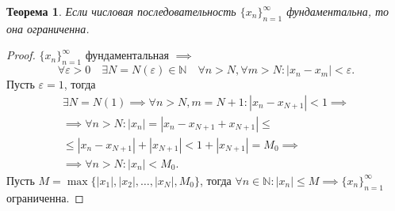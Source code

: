 \documentclass[a4paper,12pt]{article} %
\newtheorem{theorem}{Теорема}[subsection]
\theoremstyle{remark}
\begin{document}
\begin{theorem}
	Если числовая последовательность $\{x_n\}_{n=1}^{\infty}$ фундаментальна, то она ограниченна.
\end{theorem}
\begin{proof}
	$\{x_n\}_{n=1}^{\infty}$ фундаментальная $\implies$
	\[
	\forall \varepsilon>0 \quad \exists N=N(\varepsilon)\in \mathbb{N} \quad \forall n>N, \forall m>N : |x_n-x_m| < \varepsilon
	.\] 
	Пусть $\varepsilon=1$, тогда
	\begin{multline}
	\exists N=N(1) \implies \forall n>N, m=N+1 : |x_n - x_{N+1}|<1 \implies \\
	\implies \forall n>N : |x_n| = |x_n - x_{N+1} + x_{N+1}| \le \\
	\le |x_n - x_{N+1}| + |x_{N+1}| < 1 + |x_{N+1}| = M_0 \implies \\
	\implies \forall n>N : |x_n| < M_0.
	\end{multline}
	Пусть $M = \max \{|x_1|, |x_2|, \ldots, |x_N|, M_0\}$, тогда $\forall n\in \mathbb{N} : |x_n| \le M \implies \{x_n\}_{n=1}^{\infty}$ ограниченна.
\end{proof}
\begin{center}
\end{center}
\end{document}
